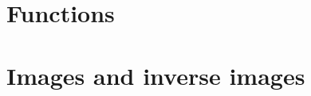 \documentclass[../main.tex]{subfiles}
\begin{document}
\addtocounter{section}{2}
\section{Functions}\label{3.3}

\section{Images and inverse images}\label{3.4}

\end{document}
